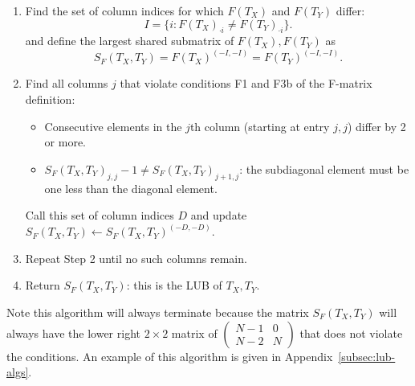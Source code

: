 \documentclass{article}
\begin{document}
\begin{algorithm}[H]
\caption{Algorithm to find the least upper bound of two binary ranked tree shapes}
\label{alg:tree_binary_lub}
\vspace{0.1in}
\vspace{0.1in}

\begin{enumerate}
    \item Find the set of column indices for which $F(T_X)$ and $F(T_Y)$ differ: \[ I = \{i: F(T_X)_{\cdot i} \neq F(T_Y)_{\cdot i} \}. \] and define the largest shared submatrix of $F(T_X), F(T_Y)$ as \[ S_F(T_X, T_Y) = F(T_X)^{(-I, -I)} = F(T_Y)^{(-I, -I)}.\]
    \item Find all columns $j$ that violate conditions F1 and F3b of the F-matrix definition:  
    \begin{itemize}
        \item Consecutive elements in the $j$th column (starting at entry $j,j$) differ by 2 or more. 
        \item $S_F(T_X, T_Y)_{j,j} -1 \neq S_F(T_X, T_Y)_{j+1,j}$: the subdiagonal element must be one less than the diagonal element.
    \end{itemize}
    Call this set of column indices $D$ and update $S_F(T_X, T_Y)\gets S_F(T_X, T_Y)^{(-D, -D)}$. 
    \item Repeat Step 2 until no such columns remain. 
    \item Return $S_F(T_X, T_Y)$: this is the LUB of $T_X, T_Y$. 
\end{enumerate}
\end{algorithm}
\vspace{0.1in}

Note this algorithm will always terminate because the matrix $S_F(T_X, T_Y)$ will always have the lower right $2\times 2$ matrix of $\begin{pmatrix} N-1 & 0 \\ N-2 & N \end{pmatrix}$ that does not violate the conditions. An example of this algorithm is given in Appendix~\ref{subsec:lub-algs}. 
\end{document}
